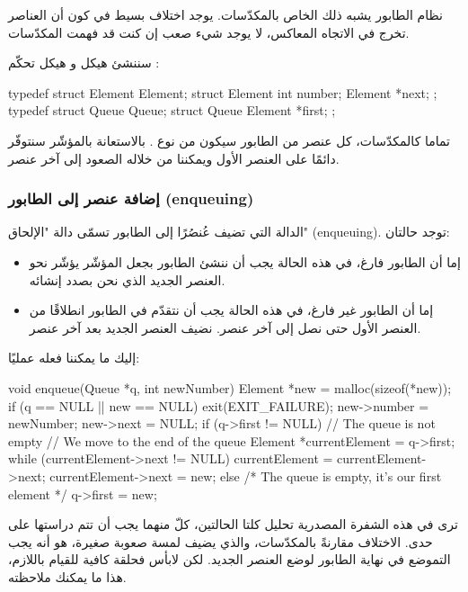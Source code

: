 نظام الطابور يشبه ذلك الخاص بالمكدّسات. يوجد اختلاف بسيط في كون أن العناصر تخرج في الاتجاه المعاكس، لا يوجد شيء صعب إن كنت قد فهمت المكدّسات.

سننشئ هيكل
و هيكل تحكّم
:

\begin{Csource}
typedef struct Element Element;
struct Element
{
	int number;
	Element *next;
};
typedef struct Queue Queue;
struct Queue
{
	Element *first;
};
\end{Csource}

تماما كالمكدّسات، كل عنصر من الطابور سيكون من نوع
.
بالاستعانة بالمؤشّر 
سنتوفّر دائمًا على العنصر الأول ويمكننا من خلاله الصعود إلى آخر عنصر.

\subsubsection{إضافة عنصر إلى الطابور (\textenglish{enqueuing})}

الدالة التي تضيف عُنصُرًا إلى الطابور تسمّى دالة "الإلحاق"
(\textenglish{enqueuing}).
توجد حالتان:

\begin{itemize}
	\item إما أن الطابور فارغ، في هذه الحالة يجب أن ننشئ الطابور بجعل المؤشّر
	يؤشّر نحو العنصر الجديد الذي نحن بصدد إنشائه.
	\item إما أن الطابور غير فارغ، في هذه الحالة يجب أن نتقدّم في الطابور انطلاقًا من العنصر الأول حتى نصل إلى آخر عنصر. نضيف العنصر الجديد بعد آخر عنصر.
\end{itemize}
إليك ما يمكننا فعله عمليًا:

\begin{Csource}
void enqueue(Queue *q, int newNumber)
{
	Element *new = malloc(sizeof(*new));
	if (q == NULL || new == NULL)
	{
		exit(EXIT_FAILURE);
	}
	new->number = newNumber;
	new->next = NULL;
	if (q->first != NULL) // The queue is not empty
	{
		// We move to the end of the queue
		Element *currentElement = q->first;
		while (currentElement->next != NULL)
		{
			currentElement = currentElement->next;
		}
		currentElement->next = new;
	}
	else /* The queue is empty, it's our first element */
	{
		q->first = new;
	}
}
\end{Csource}

ترى في هذه الشفرة المصدرية تحليل كلتا الحالتين، كلّ منهما يجب أن تتم دراستها على حدى. الاختلاف مقارنةً بالمكدّسات، والذي يضيف لمسة صعوبة صغيرة، هو أنه يجب التموضع في نهاية الطابور لوضع العنصر الجديد. لكن لابأس فحلقة
كافية للقيام باللازم، هذا ما يمكنك ملاحظته.

